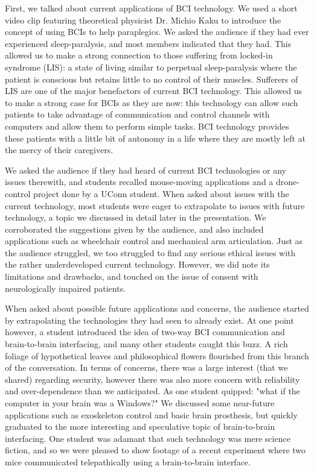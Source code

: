 \documentclass[12pt]{article}
\begin{document}
First, we talked about current applications of BCI technology. We used a short video clip featuring theoretical physicist Dr. Michio Kaku to introduce the concept of using BCIs to help paraplegics. We asked the audience if they had ever experienced sleep-paralysis,  and most members indicated that they had. This allowed us to make a strong connection to those suffering from locked-in syndrome (LIS): a state of living similar to perpetual sleep-paralysis where the patient is conscious but retains little to no control of their muscles. Sufferers of LIS are one of the major benefactors of current BCI technology. This allowed us to make a strong case for BCIs as they are now: this technology can allow such patients to take advantage of communication and control channels with computers and allow them to perform simple tasks. BCI technology provides these patients with a little bit of autonomy in a life where they are mostly left at the mercy of their caregivers.

We asked the audience if they had heard of current BCI technologies or any issues therewith, and students recalled mouse-moving applications and a drone-control project done by a UConn student. When asked about issues with the current technology, most students were eager to extrapolate to issues with future technology, a topic we discussed in detail later in the presentation. We corroborated the suggestions given by the audience, and also included applications such as wheelchair control and mechanical arm articulation. Just as the audience struggled, we too struggled to find any serious ethical issues with the rather underdeveloped current technology. However, we did note its limitations and drawbacks, and touched on the issue of consent with neurologically impaired patients.

When asked about possible future applications and concerns, the audience started by extrapolating the technologies they had seen to already exist. At one point however, a student introduced the idea of two-way BCI communication and brain-to-brain interfacing, and many other students caught this buzz. A rich foliage of hypothetical leaves and philosophical flowers flourished from this branch of the conversation. In terms of concerns, there was a large interest (that we shared) regarding security, however there was also more concern with reliability and over-dependence than we anticipated. As one student quipped: "what if the computer in your brain was a Windows?" We discussed some near-future applications such as exoskeleton control and basic brain prosthesis, but quickly graduated to the more interesting and speculative topic of brain-to-brain interfacing. One student was adamant that such technology was mere science fiction, and so we were pleased to show footage of a recent experiment where two mice communicated telepathically using a brain-to-brain interface.
\end{document}
